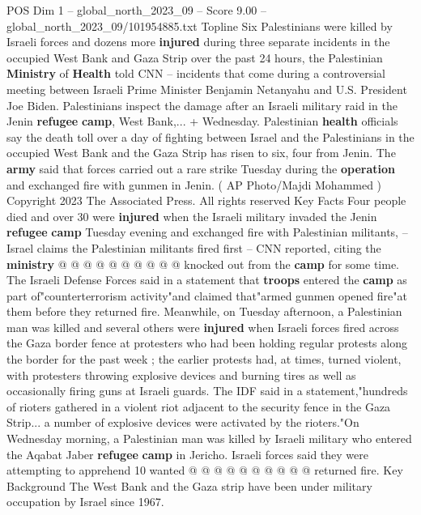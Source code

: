 \begin{textsample}{POS Dim 1 – global\_north\_2023\_09 – Score 9.00 – global\_north\_2023\_09/101954885.txt}  \label{ex:f1_pos_360}
Topline Six Palestinians were killed by Israeli forces and dozens more \textbf{injured} during three separate incidents in the occupied West Bank and Gaza Strip over the past 24 hours, the Palestinian \textbf{Ministry} of \textbf{Health} told CNN -- incidents that come during a controversial meeting between Israeli Prime Minister Benjamin Netanyahu and U.S.
President Joe Biden.
Palestinians inspect the damage after an Israeli military raid in the Jenin \textbf{refugee} \textbf{camp}, West Bank,... + Wednesday.
Palestinian \textbf{health} officials say the death toll over a day of fighting between Israel and the Palestinians in the occupied West Bank and the Gaza Strip has risen to six, four from Jenin.
The \textbf{army} said that forces carried out a rare strike Tuesday during the \textbf{operation} and exchanged fire with gunmen in Jenin. ( AP Photo/Majdi Mohammed ) Copyright 2023 The Associated Press.
All rights reserved Key Facts Four people died and over 30 were \textbf{injured} when the Israeli military invaded the Jenin \textbf{refugee} \textbf{camp} Tuesday evening and exchanged fire with Palestinian militants, -- Israel claims the Palestinian militants fired first -- CNN reported, citing the \textbf{ministry} @ @ @ @ @ @ @ @ @ @ knocked out from the \textbf{camp} for some time.
The Israeli Defense Forces said in a statement that \textbf{troops} entered the \textbf{camp} as part of"counterterrorism activity"and claimed that"armed gunmen opened fire"at them before they returned fire.
Meanwhile, on Tuesday afternoon, a Palestinian man was killed and several others were \textbf{injured} when Israeli forces fired across the Gaza border fence at protesters who had been holding regular protests along the border for the past week ; the earlier protests had, at times, turned violent, with protesters throwing explosive devices and burning tires as well as occasionally firing guns at Israeli guards.
The IDF said in a statement,"hundreds of rioters gathered in a violent riot adjacent to the security fence in the Gaza Strip... a number of explosive devices were activated by the rioters."On Wednesday morning, a Palestinian man was killed by Israeli military who entered the Aqabat Jaber \textbf{refugee} \textbf{camp} in Jericho.
Israeli forces said they were attempting to apprehend 10 wanted @ @ @ @ @ @ @ @ @ @ returned fire.
Key Background The West Bank and the Gaza strip have been under military occupation by Israel since 1967.

\end{textsample}
